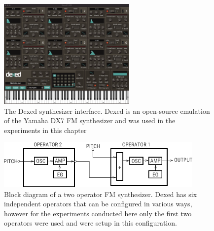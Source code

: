\begin{figure}[ht]
    \centering
    \includegraphics[width=0.6\textwidth]{figures/spiegelib/dexed.png}
    \caption{The Dexed synthesizer interface. Dexed is an open-source emulation of the Yamaha DX7 FM synthesizer and was used in the experiments in this chapter}
    \label{fig:dexed}
\end{figure}

\begin{figure}[ht]
    \centering
    \includegraphics[width=0.9\textwidth]{figures/spiegelib/two_op_fm_block.png}
    \caption{Block diagram of a two operator FM synthesizer. Dexed has six independent operators that can be configured in various ways, however for the experiments conducted here only the first two operators were used and were setup in this configuration.}
    \label{fig:two_op_fm_block}
\end{figure}

